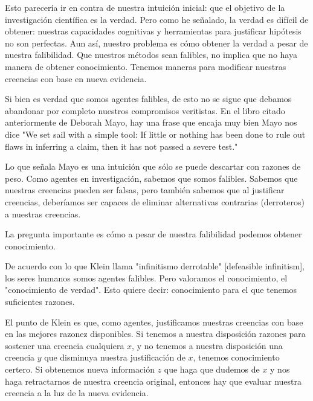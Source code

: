 {{{{{Esto parecería ir en contra de nuestra intuición inicial: que el objetivo de la investigación científica es la verdad.
Pero como he señalado, la verdad es difícil de obtener: nuestras capacidades cognitivas y herramientas para justificar hipótesis no son perfectas.
Aun así, nuestro problema es cómo obtener la verdad a pesar de nuestra falibilidad.
Que nuestros métodos sean falibles, no implica que no haya manera de obtener conocimiento.
Tenemos maneras para modificar nuestras creencias con base en nueva evidencia.

Si bien es verdad que somos agentes falibles, de esto no se sigue que debamos abandonar por completo nuestros compromisos veritistas.
En el libro citado anteriormente de Deborah Mayo, hay una frase que encaja muy bien %
Mayo nos dice "We set sail with a simple tool: If little or nothing has been done to rule out flaws in inferring a claim, then it has not passed a severe test." %

Lo que señala Mayo es una intuición que sólo se puede descartar con razones de peso.
Como agentes en investigación, sabemos que somos falibles.
Sabemos que nuestras creencias pueden ser falsas, pero también sabemos que al justificar creencias, deberíamos ser capaces de eliminar alternativas contrarias (derroteros) a nuestras creencias.

La pregunta importante es cómo a pesar de nuestra falibilidad podemos obtener conocimiento.

De acuerdo con lo que Klein llama "infinitismo derrotable" [defeasible infinitism], los seres humanos somos agentes falibles.
Pero valoramos el conocimiento, el "conocimiento de verdad".
Esto quiere decir: conocimiento para el que tenemos suficientes razones.

El punto de Klein es que, como agentes, justificamos nuestras creencias con base en las mejores razonez disponibles.
Si tenemos a nuestra disposición razones para sostener una creencia cualquiera $x$, y no tenemos a nuestra disposición una creencia $y$ que disminuya nuestra justificación de $x$, tenemos conocimiento certero.
Si obtenemos nueva información $z$ que haga que dudemos de $x$ y nos haga retractarnos de nuestra creencia original, entonces hay que evaluar nuestra creencia a la luz de la nueva evidencia.

}}}}}
